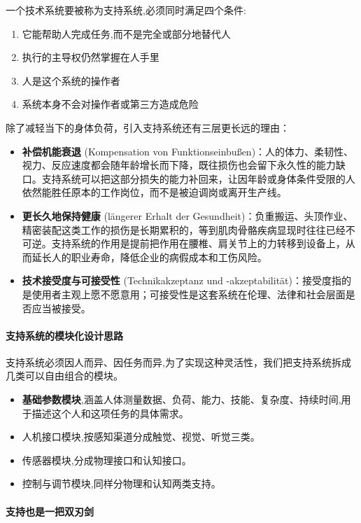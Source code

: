 一个技术系统要被称为支持系统,必须同时满足四个条件:
\begin{enumerate}
    \item 它能帮助人完成任务,而不是完全或部分地替代人
    \item 执行的主导权仍然掌握在人手里
    \item 人是这个系统的操作者
    \item 系统本身不会对操作者或第三方造成危险
\end{enumerate}

除了减轻当下的身体负荷，引入支持系统还有三层更长远的理由：
\begin{itemize}
    \item \textbf{补偿机能衰退} (Kompensation von Funktionseinbußen)：人的体力、柔韧性、视力、反应速度都会随年龄增长而下降，既往损伤也会留下永久性的能力缺口。支持系统可以把这部分损失的能力补回来，让因年龄或身体条件受限的人依然能胜任原本的工作岗位，而不是被迫调岗或离开生产线。
    \item \textbf{更长久地保持健康} (längerer Erhalt der Gesundheit)：负重搬运、头顶作业、精密装配这类工作的损伤是长期累积的，等到肌肉骨骼疾病显现时往往已经不可逆。支持系统的作用是提前把作用在腰椎、肩关节上的力转移到设备上，从而延长人的职业寿命，降低企业的病假成本和工伤风险。
    \item \textbf{技术接受度与可接受性} (Technikakzeptanz und -akzeptabilität)：接受度指的是使用者主观上愿不愿意用；可接受性是这套系统在伦理、法律和社会层面是否应当被接受。
\end{itemize}

\paragraph{支持系统的模块化设计思路}

支持系统必须因人而异、因任务而异,为了实现这种灵活性，我们把支持系统拆成几类可以自由组合的模块。
\begin{itemize}
    \item \textbf{基础参数模块},涵盖人体测量数据、负荷、能力、技能、复杂度、持续时间,用于描述这个人和这项任务的具体需求。
    \item 人机接口模块,按感知渠道分成触觉、视觉、听觉三类。
    \item 传感器模块,分成物理接口和认知接口。
    \item 控制与调节模块,同样分物理和认知两类支持。
\end{itemize}

\paragraph{支持也是一把双刃剑}


